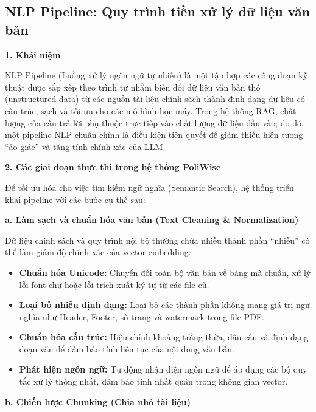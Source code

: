 \documentclass[12pt,a4paper]{report}
\begin{document}
\subsection{NLP Pipeline: Quy trình tiền xử lý dữ liệu văn bản}
\textbf{1. Khái niệm}

NLP Pipeline (Luồng xử lý ngôn ngữ tự nhiên) là một tập hợp các công đoạn kỹ thuật được sắp xếp theo trình tự nhằm biến đổi dữ liệu văn bản thô (unstructured data) từ các nguồn tài liệu chính sách thành định dạng dữ liệu có cấu trúc, sạch và tối ưu cho các mô hình học máy. Trong hệ thống RAG, chất lượng của câu trả lời phụ thuộc trực tiếp vào chất lượng dữ liệu đầu vào; do đó, một pipeline NLP chuẩn chỉnh là điều kiện tiên quyết để giảm thiểu hiện tượng ``ảo giác'' và tăng tính chính xác của LLM.

\textbf{2. Các giai đoạn thực thi trong hệ thống PoliWise}

Để tối ưu hóa cho việc tìm kiếm ngữ nghĩa (Semantic Search), hệ thống triển khai pipeline với các bước cụ thể sau:

\textbf{a. Làm sạch và chuẩn hóa văn bản (Text Cleaning \& Normalization)}

Dữ liệu chính sách và quy trình nội bộ thường chứa nhiều thành phần ``nhiễu'' có thể làm giảm độ chính xác của vector embedding:
\begin{itemize}
    \item \textbf{Chuẩn hóa Unicode:} Chuyển đổi toàn bộ văn bản về bảng mã chuẩn, xử lý lỗi font chữ hoặc lỗi trích xuất ký tự từ các file cũ.
    \item \textbf{Loại bỏ nhiễu định dạng:} Loại bỏ các thành phần không mang giá trị ngữ nghĩa như Header, Footer, số trang và watermark trong file PDF.
    \item \textbf{Chuẩn hóa cấu trúc:} Hiệu chỉnh khoảng trắng thừa, dấu câu và định dạng đoạn văn để đảm bảo tính liên tục của nội dung văn bản.
    \item \textbf{Phát hiện ngôn ngữ:} Tự động nhận diện ngôn ngữ để áp dụng các bộ quy tắc xử lý thống nhất, đảm bảo tính nhất quán trong không gian vector.
\end{itemize}

\textbf{b. Chiến lược Chunking (Chia nhỏ tài liệu)}
\end{document}
